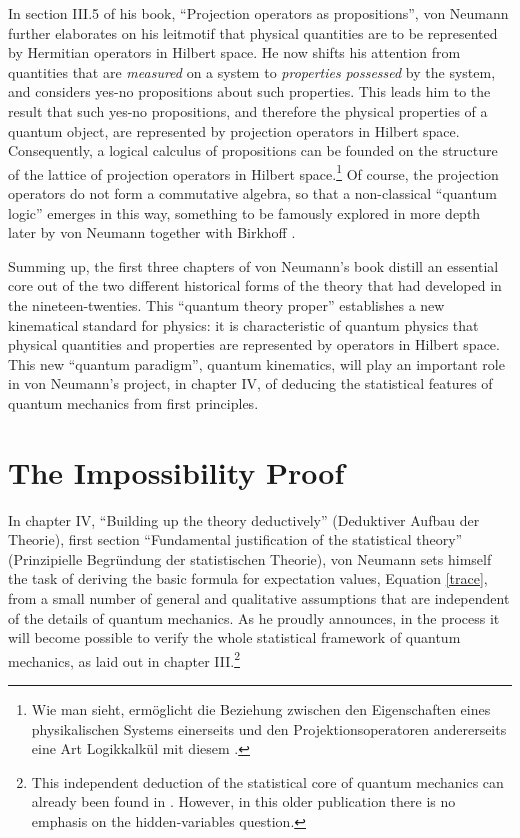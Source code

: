 \documentclass[12pt]{article}
\begin{document}
In section III.5 of his book, ``Projection operators as propositions'', von Neumann further elaborates on his leitmotif that physical quantities are to be represented by Hermitian operators in Hilbert space. He now shifts his attention from quantities that are \emph{measured} on a system to \emph{properties} \emph{possessed} by the system, and considers yes-no propositions about such properties. This leads him to the result that such yes-no propositions, and therefore the physical properties of a quantum object, are represented by projection operators in Hilbert space. Consequently, a logical calculus of propositions can be founded on the structure of the lattice of projection operators in Hilbert space.\footnote{Wie man sieht, erm\"{o}glicht die Beziehung zwischen den Eigenschaften eines physikalischen Systems einerseits und den Projektionsoperatoren andererseits eine Art Logikkalk\"{u}l mit diesem \cite[p.\@ 134]{VN1}.} Of course, the projection operators do not form a commutative algebra, so that a non-classical ``quantum logic'' emerges in this way, something to be famously explored in more depth later by von Neumann together with Birkhoff \cite{birkhoff}.

Summing up, the first three chapters of von Neumann's book distill an essential core out of the two different historical forms of the theory that had developed in the nineteen-twenties. This ``quantum theory proper'' establishes a new kinematical standard for physics: it is characteristic of quantum physics that physical quantities and properties are represented by operators in Hilbert space. This new ``quantum paradigm'', quantum kinematics, will play an important role in von Neumann's project, in chapter IV, of deducing the statistical features of quantum mechanics from first principles.

\section{The Impossibility Proof}\label{proof}

In chapter IV, ``Building up the theory deductively'' (Deduktiver Aufbau der Theorie), first section ``Fundamental justification of the statistical theory'' (Prinzipielle Begr\"{u}ndung der statistischen Theorie), von Neumann sets himself the task of deriving the basic formula for expectation values, Equation \ref{trace}, from a small number of general and qualitative assumptions that are independent of the details of quantum mechanics. As he proudly announces, in the process it will become possible to verify the whole statistical framework of quantum mechanics, as laid out in chapter III.\footnote{This independent deduction of the statistical core of quantum mechanics can already been found in \cite{VN2}. However, in this older publication there is no emphasis on the hidden-variables question.}
\end{document}

